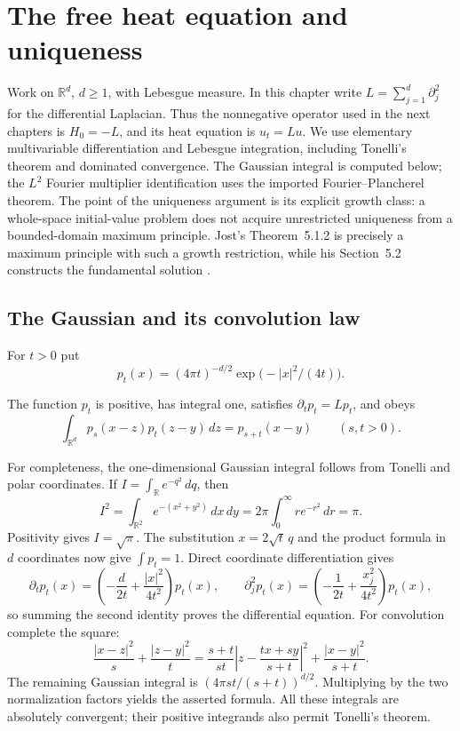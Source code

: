 \def\topic{The free heat equation and uniqueness}

\section{The free heat equation and uniqueness}
\label{sec:free_heat_equation}
Work on $\mathbb R^d$, $d\geq1$, with Lebesgue measure. In this
chapter write $L=\sum_{j=1}^d\partial_j^2$ for the differential
Laplacian. Thus the nonnegative operator used in the next chapters is
$H_0=-L$, and its heat equation is $u_t=Lu$.
We use elementary multivariable differentiation and Lebesgue integration,
including Tonelli's theorem and dominated convergence. The Gaussian
integral is computed below; the $L^2$ Fourier multiplier identification
uses the imported Fourier--Plancherel theorem. The point of the uniqueness argument is its
explicit growth class: a whole-space initial-value problem does not
acquire unrestricted uniqueness from a bounded-domain maximum principle.
Jost's Theorem~5.1.2 is precisely a maximum principle with such a
growth restriction, while his Section~5.2 constructs the fundamental
solution \parencite{Jost2013PDE}.

\subsection{The Gaussian and its convolution law}
For $t>0$ put
\[
p_t(x)=(4\pi t)^{-d/2}\exp\bigl(-|x|^2/(4t)\bigr).
\]
\begin{lemma}
\label{lem:free_gaussian_convolution}
The function $p_t$ is positive, has integral one, satisfies
$\partial_tp_t=Lp_t$, and obeys
\[
\int_{\mathbb R^d}p_s(x-z)p_t(z-y)\,dz=p_{s+t}(x-y)
\qquad(s,t>0).
\]
\end{lemma}
\Proof
For completeness, the one-dimensional Gaussian integral follows from
Tonelli and polar coordinates. If $I=\int_{\mathbb R}e^{-q^2}\,dq$,
then
\[
I^2=\int_{\mathbb R^2}e^{-(x^2+y^2)}\,dx\,dy
=2\pi\int_0^\infty r e^{-r^2}\,dr=\pi.
\]
Positivity gives $I=\sqrt\pi$. The substitution $x=2\sqrt t\,q$
and the product formula in $d$ coordinates now give $\int p_t=1$. Direct
coordinate differentiation gives
\[
\partial_tp_t(x)=\left(-\frac d{2t}+\frac{|x|^2}{4t^2}\right)p_t(x),
\qquad
\partial_j^2p_t(x)=\left(-\frac1{2t}+\frac{x_j^2}{4t^2}\right)p_t(x),
\]
so summing the second identity proves the differential equation.
For convolution complete the square:
\[
\frac{|x-z|^2}{s}+\frac{|z-y|^2}{t}
=\frac{s+t}{st}\left|z-\frac{tx+sy}{s+t}\right|^2
 +\frac{|x-y|^2}{s+t}.
\]
The remaining Gaussian integral is
$(4\pi st/(s+t))^{d/2}$. Multiplying by the two normalization
factors yields the asserted formula. All these integrals are absolutely
convergent; their positive integrands also permit Tonelli's theorem.
\Done

